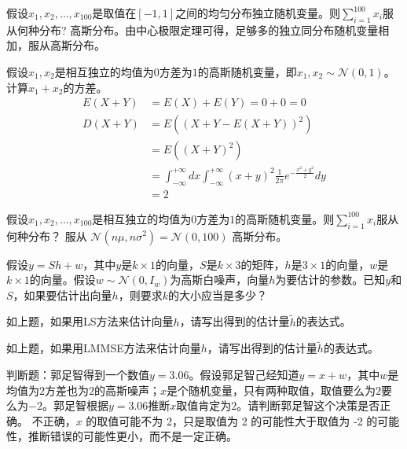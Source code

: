 \begin{problem}
	假设$x_1,x_2,\ldots,x_{100}$是取值在$[-1,1]$之间的均匀分布独立随机变量。则$\sum_{i=1}^{100}x_i$服从何种分布?
	\solution 高斯分布。由中心极限定理可得，足够多的独立同分布随机变量相加，服从高斯分布。
\end{problem}

\begin{problem}
	假设$x_1,x_2$是相互独立的均值为$0$方差为$1$的高斯随机变量，即$x_1,x_2\sim \mathcal{N}(0,1)$。计算$x_1+x_2$的方差。
	\solution \begin{align*}
		E(X + Y) &= E(X) + E(Y) = 0 + 0 = 0\\
		D(X + Y) &= E((X + Y - E(X + Y))^2)\\
		&=E((X + Y)^2)\\
		&=\int_{-\infty}^{+\infty}dx \int_{-\infty}^{+\infty} (x + y)^2\frac{1}{2\pi}e^{-\frac{x^2 + y^2}{2}}dy\\
		&=2
	\end{align*}
\end{problem}

\begin{problem}
	假设$x_1,x_2,\ldots,x_{100}$是相互独立的均值为$0$方差为$1$的高斯随机变量。则$\sum_{i=1}^{100}x_i$服从何种分布？
	\solution 服从 $\mathcal{N}(n\mu, n\sigma^2) = \mathcal{N}(0, 100)$ 高斯分布。
\end{problem}

\begin{problem}[\todo]
	假设$y=Sh+w$，其中$y$是$k\times 1$的向量，$S$是$k\times 3$的矩阵，$h$是$3\times 1$的向量，$w$是$k\times 1$的向量。假设$w\sim\mathcal{N}(0,I_w)$为高斯白噪声，向量$h$为要估计的参数。已知$y$和$S$，如果要估计出向量$h$，则要求$k$的大小应当是多少？
	\solution 
\end{problem}

\begin{problem}[\todo]
	如上题，如果用LS方法来估计向量$h$，请写出得到的估计量$\tilde{h}$的表达式。
	\solution 
\end{problem}

\begin{problem}[\todo]
	如上题，如果用LMMSE方法来估计向量$h$，请写出得到的估计量$\tilde{h}$的表达式。
	\solution 
\end{problem}

\begin{problem}
	判断题：郭足智得到一个数值$y=3.06$。假设郭足智己经知道$y=x+w$，其中$w$是均值为$2$方差也为$2$的高斯噪声；$x$是个随机变量，只有两种取值，取值要么为$2$要么为$-2$。郭足智根据$y=3.06$推断$x$取值肯定为$2$。请判断郭足智这个决策是否正确。
	\solution 不正确，$x$ 的取值可能不为 2，只是取值为 2 的可能性大于取值为 -2 的可能性，推断错误的可能性更小，而不是一定正确。
\end{problem}

